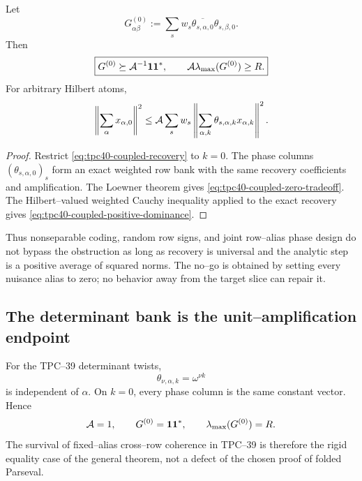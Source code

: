 \begin{theorem}
\label{thm:tpc40-coupled-zero-slice}
Let
\begin{equation}
 G^{(0)}_{\alpha\beta}
 :=\sum_sw_s
 \overline{\theta_{s,\alpha,0}}\theta_{s,\beta,0}.
 \label{eq:tpc40-coupled-zero-Gram}
\end{equation}
Then
\begin{equation}
 \boxed{
 G^{(0)}\succeq\mathcal A^{-1}\mathbf 1\mathbf 1^*,
 \qquad
 \mathcal A\lambda_{\max}(G^{(0)})\ge R.}
 \label{eq:tpc40-coupled-zero-tradeoff}
\end{equation}
For arbitrary Hilbert atoms,
\begin{equation}
 \left\|\sum_{\alpha}x_{\alpha,0}\right\|^2
 \le
 \mathcal A\sum_sw_s
 \left\|\sum_{\alpha,k}
 \theta_{s,\alpha,k}x_{\alpha,k}\right\|^2.
 \label{eq:tpc40-coupled-positive-dominance}
\end{equation}
\end{theorem}

\begin{proof}
Restrict \eqref{eq:tpc40-coupled-recovery} to \(k=0\).  The phase columns
\((\theta_{s,\alpha,0})_s\) form an exact weighted row bank with the same
recovery coefficients and amplification.  The Loewner theorem gives
\eqref{eq:tpc40-coupled-zero-tradeoff}.  The Hilbert--valued weighted
Cauchy inequality applied to the exact recovery gives
\eqref{eq:tpc40-coupled-positive-dominance}.
\end{proof}

Thus nonseparable coding, random row signs, and joint row--alias phase
design do not bypass the obstruction as long as recovery is universal and
the analytic step is a positive average of squared norms.  The no--go is
obtained by setting every nuisance alias to zero; no behavior away from
the target slice can repair it.

\subsection{The determinant bank is the unit--amplification endpoint}

For the TPC--39 determinant twists,
\begin{equation}
 \theta_{\nu,\alpha,k}=\omega^{\nu k}
 \label{eq:tpc40-determinant-phase}
\end{equation}
is independent of \(\alpha\).  On \(k=0\), every phase column is the same
constant vector.  Hence
\begin{equation}
 \mathcal A=1,
 \qquad
 G^{(0)}=\mathbf 1\mathbf 1^*,
 \qquad
 \lambda_{\max}(G^{(0)})=R.
 \label{eq:tpc40-determinant-max-coherence}
\end{equation}
The survival of fixed--alias cross--row coherence in TPC--39 is therefore
the rigid equality case of the general theorem, not a defect of the
chosen proof of folded Parseval.
